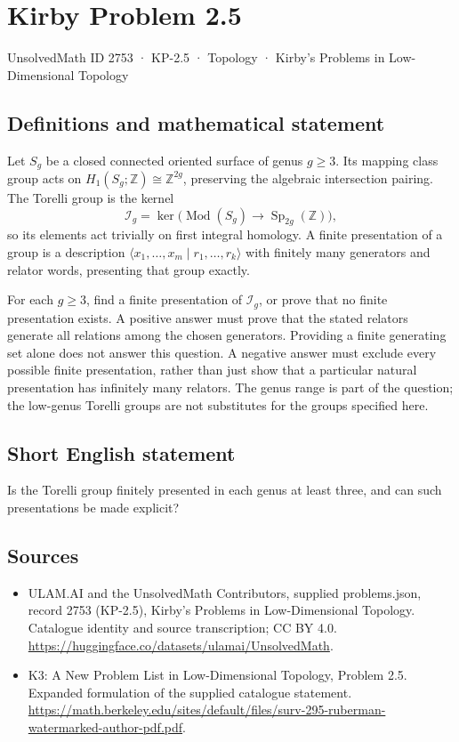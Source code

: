 \documentclass[11pt,a4paper]{article}
\begin{document}
\section*{Kirby Problem 2.5}\label{2753}
{\small UnsolvedMath ID 2753 · KP-2.5 · Topology · Kirby's Problems in Low-Dimensional Topology}
\subsection{Definitions and mathematical statement}
Let $S_g$ be a closed connected oriented surface of genus $g\geq3$.
Its mapping class group acts on $H_1(S_g;\mathbb Z)\cong\mathbb Z^{2g}$,
preserving the algebraic intersection pairing. The Torelli group is the kernel
\[
\mathcal I_g=\ker\bigl(\operatorname{Mod}(S_g)
\longrightarrow\operatorname{Sp}_{2g}(\mathbb Z)\bigr),
\]
so its elements act trivially on first integral homology.
A finite presentation of a group is a description
$\langle x_1,\ldots,x_m\mid r_1,\ldots,r_k\rangle$ with finitely many
generators and relator words, presenting that group exactly.

For each $g\geq3$, find a finite presentation of $\mathcal I_g$, or prove that
no finite presentation exists. A positive answer must prove that the stated
relators generate all relations among the chosen generators. Providing a finite
generating set alone does not answer this question. A negative answer must
exclude every possible finite presentation, rather than just show that a
particular natural presentation has infinitely many relators.
The genus range is part of the question; the low-genus Torelli groups are not
substitutes for the groups specified here.
\subsection{Short English statement}
Is the Torelli group finitely presented in each genus at least three, and can such presentations be made explicit?
\subsection{Sources}
\begin{itemize}
\item[S1] ULAM.AI and the UnsolvedMath Contributors, supplied problems.json, record 2753 (KP-2.5), Kirby's Problems in Low-Dimensional Topology. Catalogue identity and source transcription; CC BY 4.0.
\url{https://huggingface.co/datasets/ulamai/UnsolvedMath}.
\item[S2] K3: A New Problem List in Low-Dimensional Topology, Problem 2.5. Expanded formulation of the supplied catalogue statement.
\url{https://math.berkeley.edu/sites/default/files/surv-295-ruberman-watermarked-author-pdf.pdf}.
\end{itemize}
\end{document}
